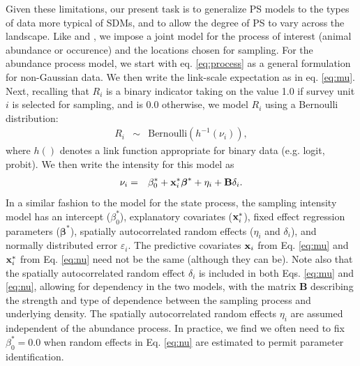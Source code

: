 \documentclass[times,mee,doublespace,]{besauth2}
\begin{document}
Given these limitations, our present task is to generalize PS models to the types of data more typical of SDMs, and to allow the degree of PS to vary across the landscape.  Like \citet{DiggleEtAl2010} and \citet{PatiEtAl2011}, we impose a joint model for the process of interest (animal abundance or occurence) and the locations chosen for sampling. For the abundance process model, we start with eq. \ref{eq:process} as a general formulation for non-Gaussian data.  We then write the link-scale expectation as in eq. \ref{eq:mu}.
Next, recalling that $R_i$ is a binary indicator taking on the value 1.0 if survey unit $i$ is selected for sampling, and is 0.0 otherwise, we model $R_i$ using a Bernoulli distribution:
\begin{eqnarray}
 \label{eq:R}
  R_i & \sim & \text{Bernoulli}(h^{-1}(\nu_i)),
\end{eqnarray}
where $h()$ denotes a link function appropriate for binary data (e.g. logit, probit).  We then write the intensity for this model as
\begin{eqnarray}
  \label{eq:nu}
  \nu_i & = & \beta_0^* + {\bf x}_i^* \boldsymbol{\beta}^*+\eta_i+{\bf B} \delta_i.
\label{eq:nu}
\end{eqnarray}
 In a similar fashion to the model for the state process, the sampling intensity model has an intercept ($\beta_0^*$), explanatory covariates (${\bf x}_i^*$), fixed effect regression parameters ($\boldsymbol{\beta}^*$), spatially autocorrelated random effects ($\eta_i$ and $\delta_i$), and normally distributed error $\varepsilon_i$.  The predictive covariates ${\bf x}_i$ from Eq. \ref{eq:mu} and ${\bf x}_i^*$ from Eq. \ref{eq:nu} need not be the same (although they can be).  Note also that the  spatially autocorrelated random effect $\delta_i$ is included in both Eqs. \ref{eq:mu} and \ref{eq:nu}, allowing for dependency in the two models, with the matrix {\bf B} describing the strength and type of dependence between the sampling process and underlying density.  The spatially autocorrelated random effects $\eta_i$ are assumed independent of the abundance process.  In practice, we find we often need to fix $\beta_0^*=0.0$ when random effects in Eq. \ref{eq:nu} are estimated to permit parameter identification.
\end{document}
